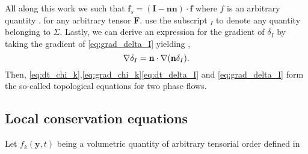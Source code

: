 All along this work we  such that $\textbf{f}_{s} = (\textbf{I}-\textbf{nn})\cdot \textbf{f}$ where $f$ is an arbitrary quantity . for any arbitrary tensor $\textbf{F}$.  use the subscript $_I$ to denote any quantity belonging to $\Sigma$.   
Lastly, we can derive an expression for the gradient of $\delta_I$ by taking the gradient of \ref{eq:grad_delta_I} yielding ,
\begin{equation}
    \mathbf{\nabla}\delta_I 
    = \textbf{n} \cdot \mathbf{\nabla} (\textbf{n} \delta_I).
    \label{eq:grad_delta_I}
\end{equation}
Then, \ref{eq:dt_chi_k},\ref{eq:grad_chi_k}\ref{eq:dt_delta_I} and \ref{eq:grad_delta_I}  form the so-called topological equations for two phase flows. %

\subsection{Local conservation equations}


Let $f_k(\textbf{y},t)$ being a volumetric quantity of arbitrary tensorial order defined in %



